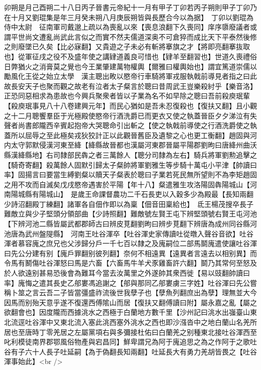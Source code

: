 卯朔是月己酉朔二十八日丙子晉書元帝紀十一月有甲子丁卯若丙子朔則甲子丁卯乃在十月又劉琨集是年三月癸未朔八月庚辰朔皆與長歷合今以為据】　丁卯以劉琨為侍中太尉　征南軍司戴邈上疏以為喪亂以來【喪息浪翻下久喪同】庠序隳廢議者或謂平世尚文遭亂尚武此言似之而實不然夫儒道深奥不可倉猝而成比天下平泰然後修之則廢墜已久矣【比必寐翻】又貴遊之子未必有斬將搴旗之才【將即亮翻搴抜取也】從軍征戌之役不及盛年使之講肄道義良可惜也【肄羊至翻習也】世道久喪禮俗日弊猶火之消膏莫之覺也今王業肇建萬物權輿【爾雅曰權輿始也】謂宜篤道崇儒以勵風化王從之始立太學　漢主聰出畋以愍帝行車騎將軍戎服執戟前導見者指之曰此故長安天子也聚而觀之故老有泣者太子粲言於聰曰昔周武王豈樂殺紂乎【樂音洛】正恐同惡相求為患故也今興兵聚衆者皆以子業為名不如早除之聰曰吾前殺庾珉輩【殺庾珉事見八十八卷建興元年】而民心猶如是吾未忍復殺也【復扶又翻】且小觀之十二月聰饗羣臣于光極殿使愍帝行酒洗爵已而更衣又使之執蓋晉臣夕夕涕泣有失聲者尚書郎隴西辛賓起抱帝大哭聰命引出斬之【使之執戟前導使之行酒洗爵使之執蓋所以屈辱之至此極矣戎狄狡計正以此觀晉舊臣及遺黎之心也更工衡翻】趙固與河内太守郭默侵漢河東至絳【絳縣故晉都也漢屬河東郡晉屬平陽郡劉昫曰唐絳州曲沃縣漢絳縣地】右司隸部民犇之者三萬餘人【聰分司隸為左右】騎兵將軍劉勲追擊之【騎奇寄翻】殺萬餘人固默引歸太子粲帥將軍劉雅生等步騎十萬屯小平津【帥讀曰率】固揚言曰要當生縛劉粲以贖天子粲表於聰曰子業若死民無所望則不為李矩趙固之用不攻而自滅矣戊戌愍帝遇害於平陽【年十八】粲遣雅生攻洛陽固犇陽城山【河南陽城縣有陽城山】　是歲王命課督農功二千石長吏以入穀多少為殿最【長知兩翻少詩沼翻殿丁練翻】諸軍各自佃作即以為稟【佃音田稟給也】　氐王楊茂搜卒長子難敵立與少子堅頭分領部曲【少詩照翻】難敵號左賢王屯下辨堅頭號右賢王屯河池【下辨河池二縣皆屬武都郡師古曰辨皮莧翻劉昫曰辨步莧翻下辨唐為成州同谷縣河池唐為武州盤隄縣】　河南王吐谷渾卒【吐谷渾史家傳讀吐從暾入聲谷音欲】吐谷渾者慕容廆之庶兄也父涉歸分戶一千七百以隸之及廆嗣位二部馬鬬廆遣使讓吐谷渾曰先公分建有别【廆戶罪翻别彼列翻】奈何不相遠異【遠異者言遠去以相别異】而令馬有鬭傷吐谷渾怒曰馬是六畜【六畜馬牛羊犬豕雞畜許六翻】鬬乃其常何至怒及於人欲遠别甚易恐後會為難耳今當去汝萬里之外遂帥其衆西徙【易以豉翻帥讀曰率】廆悔之遣其長史乙郍婁馮追謝之【郍與那同乙郍婁虜三字姓】吐谷渾曰先公嘗稱卜筮之言云吾二子皆當彊盛祚流後世我孽子也【孽魚列翻庶出為孽】理無並大今因馬而别殆天意乎遂不復還西傅隂山而居【復扶又翻傅讀曰附】屬永嘉之亂【屬之欲翻會也】因度隴而西據洮水之西極于白蘭地方數千里【沙州記曰洮水出嵹臺山東北流逕吐谷渾中又東北流入塞此洮西塞外洮水之西也即沙漒沓中之地白蘭山名羌所居也至唐時丁零羌居之左屬黨項右與多彌接杜佑曰白蘭羌之别種東北接吐谷渾西至叱利模徒南界郡鄂風俗物產與宕昌同】鮮卑謂兄為阿于廆追思之為之作阿于之歌吐谷有子六十人長子吐延嗣【為于偽翻長知兩翻】吐延長大有勇力羌胡皆畏之【吐谷渾事始此】<br />
